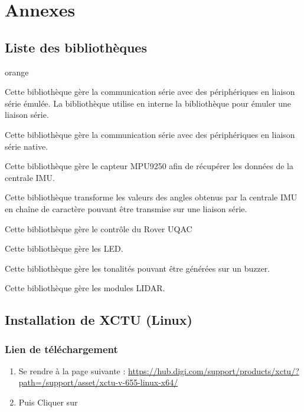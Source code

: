 \chapter{Annexes}

\section{Liste des bibliothèques}

\begin{items}{orange}{\faFile}
    \item {}
    Cette bibliothèque gère la communication série avec des périphériques en liaison série émulée. La bibliothèque utilise en interne la bibliothèque  pour émuler une liaison série.
    \item {}
    Cette bibliothèque gère la communication série avec des périphériques en liaison série native.
    \item {}
    Cette bibliothèque gère le capteur MPU9250 afin de récupérer les données de la centrale IMU.
    \item {}
    Cette bibliothèque transforme les valeurs des angles obtenus par la centrale IMU en chaîne de caractère pouvant être transmise sur une liaison série.
    \item {}
    Cette bibliothèque gère le contrôle du Rover UQAC
    \item {}
    Cette bibliothèque gère les LED.
    \item {}
    Cette bibliothèque gère les tonalités pouvant être générées sur un buzzer.
    \item {}
    Cette bibliothèque gère les modules LIDAR.
\end{items}




\section{Installation de XCTU (Linux)}
\subsection{Lien de téléchargement}

\begin{enumerate}
 \item Se rendre à la page suivante : 
\url{https://hub.digi.com/support/products/xctu/?path=/support/asset/xctu-v-655-linux-x64/}

\item Puis Cliquer sur 
\end{enumerate}


